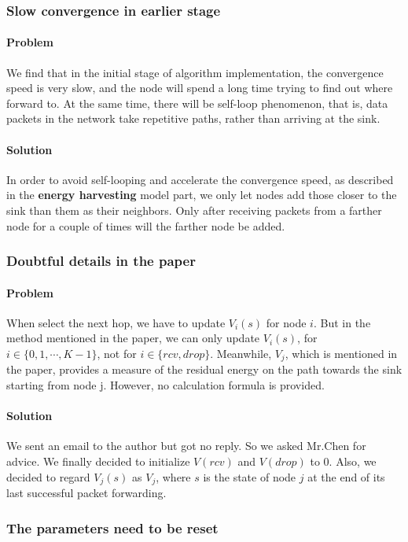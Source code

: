 \documentclass[10pt,twocolumn,letterpaper]{article}
\begin{document}
\subsubsection{Slow convergence in earlier stage}
\paragraph{Problem}
We find that in the initial stage of algorithm implementation, the convergence speed is very slow, and the node will spend a long time trying to find out where forward to. At the same time, there will be self-loop phenomenon, that is, data packets in the network take repetitive paths, rather than arriving at the sink.
\paragraph{Solution}
In order to avoid self-looping and accelerate the convergence speed, as described in the \textbf{energy harvesting} model part, we only let nodes add those closer to the sink than them as their neighbors. Only after receiving packets from a farther node for a couple of times will the farther node be added.  

\subsubsection{Doubtful details in the paper}
\paragraph{Problem}
When select the next hop, we have to update $V_i(s)$ for node $i$. But in the method mentioned in the paper, we can only update $V_i(s)$, for $i \in \{0,1,\cdots,K-1\}$, not for $i \in \{rcv, drop\}$. Meanwhile, $V_j$, which is mentioned in the paper, provides a measure of the residual energy on the path towards the sink starting from node j. However, no calculation formula is provided.
\paragraph{Solution}
We sent an email to the author but got no reply. So we asked Mr.Chen for advice. We finally decided to initialize $V(rcv)$ and $V(drop)$ to 0. Also, we decided to regard $V_j(s)$ as $V_j$, where $s$ is the state of node $j$ at the end of its last successful packet forwarding.
\subsubsection{The parameters need to be reset}
\end{document}
